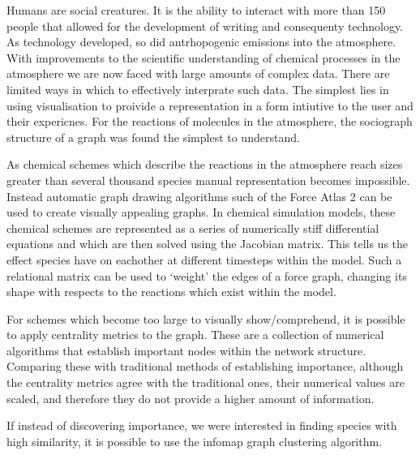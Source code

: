 Humans are social creatures. It is the ability to interact with more than 150 people that allowed for the development of writing and consequenty technology. As technology developed, so did antrhopogenic emissions into the atmosphere. With improvements to the scientific understanding of chemical processes in the atmosphere we are now faced with large amounts of complex data. There are limited ways in which to effectively interprate such data. The simplest lies in using visualisation to proivide a representation in a form intiutive to the user and their expericnes. For the reactions of molecules in the atmosphere, the sociograph structure of a graph was found the simplest to understand.

As chemical schemes which describe the reactions in the atmosphere reach sizes greater than several thousand species manual representation becomes impossible. Instead automatic graph drawing algorithms such of the Force Atlas 2 can be used to create visually appealing graphs. In chemical simulation models, these chemical schemes are represented as a series of numerically stiff differential equations and which are then solved using the Jacobian matrix. This tells us the effect species have on eachother at different timesteps within the model. Such a relational matrix can be used to `weight' the edges of a force graph, changing its shape with respects to the reactions which exist within the model.

For schemes which become too large to visually show/comprehend, it is possible to apply centrality metrics to the graph. These are a collection of numerical algorithms that establish important nodes within the network structure. Comparing these with traditional methods of establishing importance, although the centrality metrics agree with the traditional ones, their numerical values are scaled, and therefore they do not provide a higher amount of information.

If instead of discovering importance, we were interested in finding species with high similarity, it is possible to use the infomap graph clustering algorithm.
